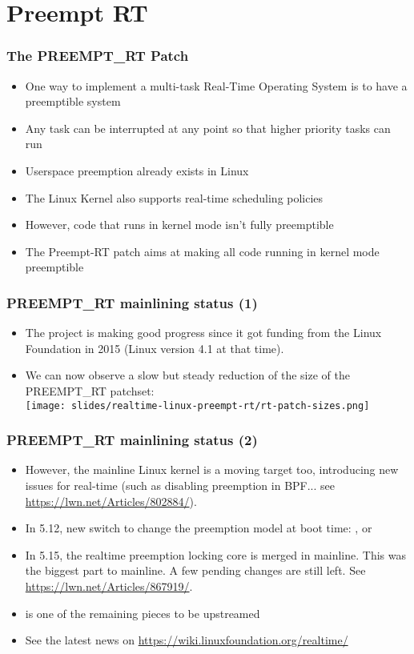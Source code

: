 \section{Preempt RT}

\begin{frame}
  \frametitle{The PREEMPT\_RT Patch}
        \begin{itemize}
                \item One way to implement a multi-task Real-Time Operating System is to have a preemptible system
                \item Any task can be interrupted at any point so that higher priority tasks can run
                \item Userspace preemption already exists in Linux
                \item The Linux Kernel also supports real-time scheduling policies
                \item However, code that runs in kernel mode isn't fully preemptible
                \item The Preempt-RT patch aims at making all code running in kernel mode preemptible
        \end{itemize}
\end{frame}

\begin{frame}
  \frametitle{PREEMPT\_RT mainlining status (1)}
  \begin{itemize}
  \item The project is making good progress since it got funding from
        the Linux Foundation in 2015 (Linux version 4.1 at that time).
  \item We can now observe a slow but steady reduction of the size of
        the PREEMPT\_RT patchset:\\
    \vfill
    \texttt{[image: slides/realtime-linux-preempt-rt/rt-patch-sizes.png]}
  \end{itemize}
\end{frame}

\begin{frame}
  \frametitle{PREEMPT\_RT mainlining status (2)}
  \begin{itemize}
  \item However, the mainline Linux kernel is a moving target too,
        introducing new issues for real-time (such as disabling preemption in
        BPF... see \url{https://lwn.net/Articles/802884/}).
  \item In 5.12, new  switch to change the preemption
        model at boot time: ,  or
  \item In 5.15, the realtime preemption locking core is merged in mainline.
        This was the biggest part to mainline. A few pending changes are
        still left. See \url{https://lwn.net/Articles/867919/}.
  \item {} is one of the remaining pieces to be upstreamed
  \item See the latest news on \url{https://wiki.linuxfoundation.org/realtime/}
  \end{itemize}
\end{frame}

